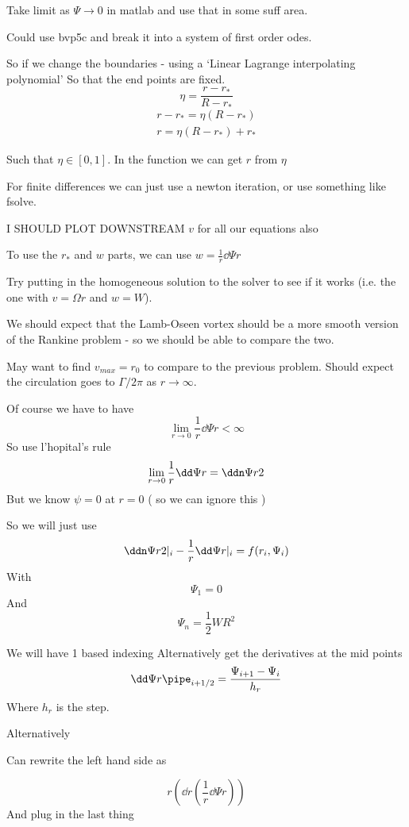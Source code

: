 \documentclass{X:/Documents/Coding/Latex/myreport}
\begin{document}
Take limit as $\Psi\to0$ in matlab and use that in some suff area.

Could use bvp5c and break it into a system of first order odes.


So if we change the boundaries - using a `Linear Lagrange interpolating polynomial'
So that the end points are fixed.
\[\eta = \frac{r-r_*}{R-r_*}\]
\begin{align*}
    r-r_* = \eta(R-r_*)\\
    r = \eta(R-r_*) + r_*   
\end{align*}


Such that $\eta \in [0,1]$.
In the function we can get $r$ from $\eta$ 

For finite differences we can just use a newton iteration, or use something like fsolve.



I SHOULD PLOT DOWNSTREAM $v$ for all our equations also



To use the $r_*$ and $w$ parts, we can use $w = \frac1r\dd\Psi r $


Try putting in the homogeneous solution to the solver to see if it works (i.e. the one with $v = \Omega r$ and $w=W$).

We should expect that the Lamb-Oseen vortex should be a more smooth version of the Rankine problem - so we should be able to compare the two.

May want to find $v_{max} = r_0$ to compare to the previous problem.
Should expect the circulation goes to $\Gamma / 2 \pi$ as $r\to \infty$.




Of course we have to have
\[\lim_{r\to 0} \frac1r \dd\Psi r < \infty\]
So use l'hopital's rule
\[\lim_{r\to 0} \frac1r \dd\Psi r = \ddn\Psi r2\]
But we know $\psi = 0$ at $r=0$ ( so we can ignore this )



So we will just use
\[\ddn \Psi r2 |_i - \frac1r \dd\Psi r|_i = f(r_i,\Psi_i)\]
With 
\[\Psi_1 = 0\]
And
\[\Psi_n = \frac12 WR^2\]

We will have 1 based indexing 
Alternatively 
get the derivatives at the mid points
\[\dd\Psi r\pipe_{i+1/2} = \frac{\Psi_{i+1} - \Psi_i}{h_r}\]
Where $h_r$ is the step.





Alternatively


Can rewrite the left hand side as

\[r\left(\dd{}r \left(\frac1r \dd\Psi r\right)\right)\]
And plug in the last thing
\[\]
\end{document}
